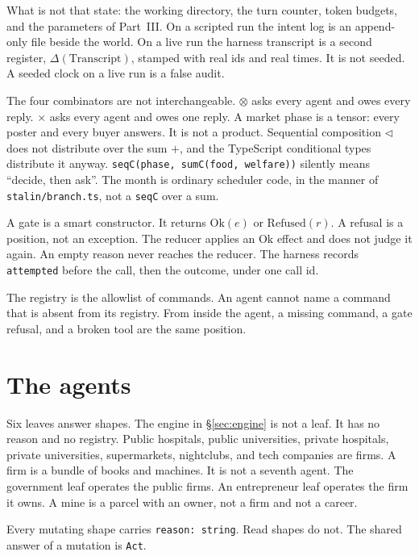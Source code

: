 \documentclass[11pt]{article}
\begin{document}
What is not that state: the working directory, the turn counter, token
budgets, and the parameters of Part~III. On a scripted run the intent log is
an append-only file beside the world. On a live run the harness transcript is
a second register, $\Delta(\mathrm{Transcript})$, stamped with real ids and
real times. It is not seeded. A seeded clock on a live run is a false audit.

The four combinators are not interchangeable. $\otimes$ asks every agent and
owes every reply. $\times$ asks every agent and owes one reply. A market
phase is a tensor: every poster and every buyer answers. It is not a product.
Sequential composition $\triangleleft$ does not distribute over the sum $+$,
and the TypeScript conditional types distribute it anyway.
\texttt{seqC(phase, sumC(food, welfare))} silently means
``decide, then ask''. The month is ordinary scheduler code, in the manner of
\texttt{stalin/branch.ts}, not a \texttt{seqC} over a sum.

A gate is a smart constructor. It returns $\mathrm{Ok}(e)$ or
$\mathrm{Refused}(r)$. A refusal is a position, not an exception. The reducer
applies an $\mathrm{Ok}$ effect and does not judge it again. An empty reason
never reaches the reducer. The harness records \texttt{attempted} before the
call, then the outcome, under one call id.

The registry is the allowlist of commands. An agent cannot name a command
that is absent from its registry. From inside the agent, a missing command, a
gate refusal, and a broken tool are the same position.

\renewcommand{\thesection}{\Roman{section}}
\renewcommand{\thesubsection}{\thesection.\arabic{subsection}}

\section{The agents}
\label{sec:agents}

Six leaves answer shapes. The engine in \S\ref{sec:engine} is not a leaf.
It has no reason and no registry. Public hospitals, public universities,
private hospitals, private universities, supermarkets, nightclubs, and tech
companies are firms. A firm is a bundle of books and machines. It is not a
seventh agent. The government leaf operates the public firms. An entrepreneur
leaf operates the firm it owns. A mine is a parcel with an owner, not a firm
and not a career.

Every mutating shape carries \texttt{reason: string}. Read shapes do not.
The shared answer of a mutation is \texttt{Act}.
\end{document}
